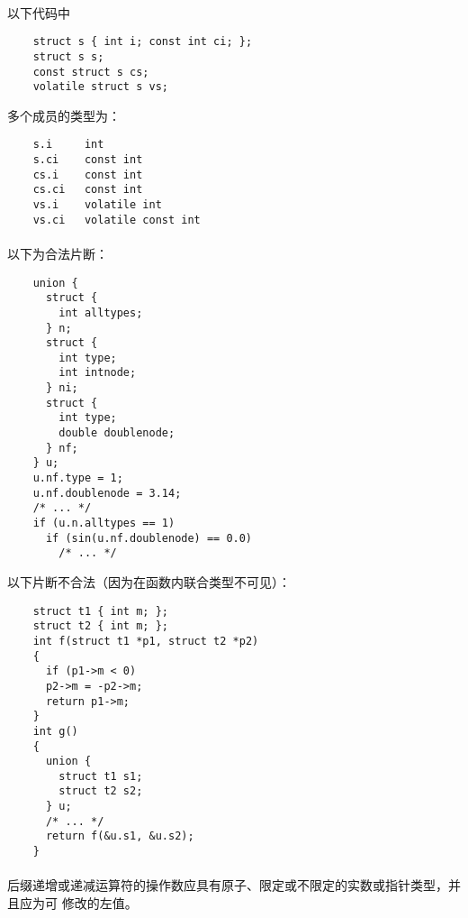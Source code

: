 {\paragraph{}
\ex 以下代码中
\begin{lstlisting}
    struct s { int i; const int ci; };
    struct s s;
    const struct s cs;
    volatile struct s vs;
\end{lstlisting}
多个成员的类型为：
\begin{lstlisting}
    s.i     int
    s.ci    const int
    cs.i    const int
    cs.ci   const int
    vs.i    volatile int
    vs.ci   volatile const int
\end{lstlisting}

\paragraph{}
\ex 以下为合法片断：
\begin{lstlisting}
    union {
      struct {
        int alltypes;
      } n;
      struct {
        int type;
        int intnode;
      } ni;
      struct {
        int type;
        double doublenode;
      } nf;
    } u;
    u.nf.type = 1;
    u.nf.doublenode = 3.14;
    /* ... */
    if (u.n.alltypes == 1)
      if (sin(u.nf.doublenode) == 0.0)
        /* ... */
\end{lstlisting}
以下片断不合法（因为在函数内联合类型不可见）：
\begin{lstlisting}
    struct t1 { int m; };
    struct t2 { int m; };
    int f(struct t1 *p1, struct t2 *p2)
    {
      if (p1->m < 0)
      p2->m = -p2->m;
      return p1->m;
    }
    int g()
    {
      union {
        struct t1 s1;
        struct t2 s2;
      } u;
      /* ... */
      return f(&u.s1, &u.s2);
    }
\end{lstlisting}


\constraint
\paragraph{}
后缀递增或递减运算符的操作数应具有原子、限定或不限定的实数或指针类型，并且应为可
修改的左值。

\semantic
}
